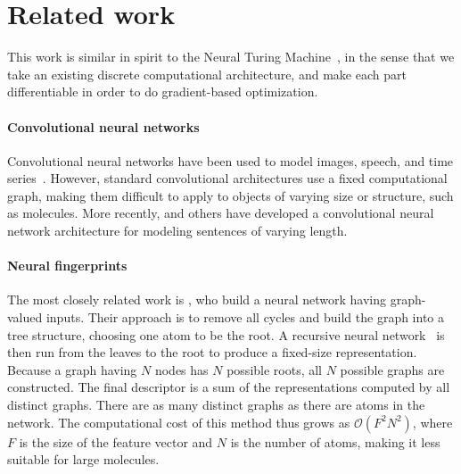 \documentclass{article}
\begin{document}



\section{Related work}
This work is similar in spirit to the Neural Turing Machine~\citep{graves2014neural}, in the sense that we take an existing discrete computational architecture, and make each part differentiable in order to do gradient-based optimization.

\paragraph{Convolutional neural networks}
Convolutional neural networks have been used to model images, speech, and time series~\citep{lecun1995convolutional}.
However, standard convolutional architectures use a fixed computational graph, making them difficult to apply to objects of varying size or structure, such as molecules.
More recently, \cite{KalchbrennerACL2014} and others have developed a convolutional neural network architecture for modeling sentences of varying length.

\paragraph{Neural fingerprints}
The most closely related work is \citet{lusci2013deep}, who build a neural network having graph-valued inputs.
Their approach is to remove all cycles and build the graph into a tree structure, choosing one atom to be the root.
A recursive neural network~\citep{socher2011dynamic, socher2011semi} is then run from the leaves to the root to produce a fixed-size representation.
Because a graph having $N$ nodes has $N$ possible roots, all $N$ possible graphs are constructed.
The final descriptor is a sum of the representations computed by all distinct graphs.
There are as many distinct graphs as there are atoms in the network.
The computational cost of this method thus grows as $\mathcal{O}(F^2N^2)$, where $F$ is the size of the feature vector and $N$ is the number of atoms, making it less suitable for large molecules.
\end{document}
